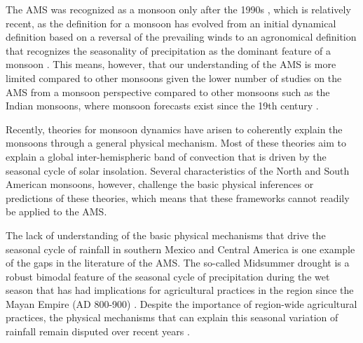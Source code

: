 The AMS was recognized as a monsoon only after the 1990s , which is relatively recent, as the definition for a monsoon has evolved from an initial dynamical definition based on a reversal of the prevailing winds to an agronomical definition that recognizes the seasonality of precipitation as the dominant feature of a monsoon \citep{wang2017,gadgil2018}. This  means, however, that our understanding of the AMS is more limited compared to other monsoons given the lower number of studies on the AMS from a monsoon perspective compared to other monsoons such as the Indian monsoons, where monsoon forecasts exist since the 19th century \citep{blanford}.


Recently, theories for monsoon dynamics \citep{bordoni2008monsoons,biasutti2018global,hill2019,geen2020} have arisen to coherently explain the monsoons through a general physical mechanism. Most of these theories aim to explain a global inter-hemispheric band of convection that is driven by the seasonal cycle of solar insolation. Several characteristics of the North and South American monsoons, however, challenge the basic physical inferences or predictions of these theories, which means that these frameworks cannot readily  be applied to the AMS.


The lack of understanding of the basic physical mechanisms that drive the seasonal cycle of rainfall in southern Mexico and Central America is one example of the gaps in the literature of the AMS. The so-called Midsummer drought is a robust bimodal feature of the seasonal cycle of precipitation during the wet season that has had implications for agricultural practices in the region since the Mayan Empire (AD 800-900) \citep{jobbova2018ritual}. Despite the importance of region-wide agricultural practices, the physical mechanisms that can explain this seasonal variation of rainfall remain disputed over recent years \citep{karnauskas2013,herrera2015,zermeno2019}. 


